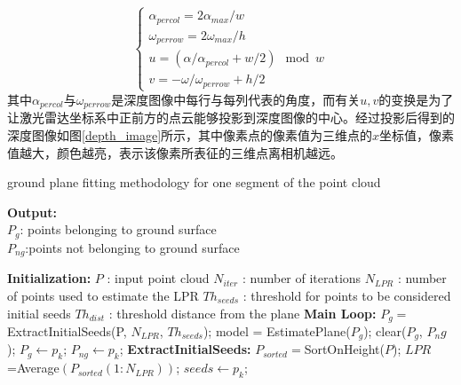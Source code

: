 \begin{equation}
    \begin{cases}
        \alpha_{percol} = 2\alpha_{max} / w \\
        \omega_{perrow} = 2\omega_{max} / h \\
        u = (\alpha / \alpha_{percol} + w / 2) \mod w \\
        v = - \omega / \omega_{perrow} + h / 2
    \end{cases}
\end{equation}
其中$\alpha_{percol}$与$\omega_{perrow}$是深度图像中每行与每列代表的角度，而有关$u,v$的变换是为了让激光雷达坐标系中正前方的点云能够投影到深度图像的中心。经过投影后得到的深度图像如图\ref{depth_image}所示，其中像素点的像素值为三维点的$x$坐标值，像素值越大，颜色越亮，表示该像素所表征的三维点离相机越远。
\begin{algorithm}[htbp]
    \caption{ground plane fitting methodology for one segment of the point cloud} %
    \label{ground plane fitting}
    \hspace*{0.02in} {\bf Output:} %
\\ $P_g$: points belonging to ground surface \\
$P_{ng}$:points not belonging to ground surface 

    \begin{algorithmic}[1]
    \State\hspace*{0.02in} {\bf Initialization:} %
    \State $P$ : input point cloud
    \State $N_{iter}$ : number of iterations
    \State $N_{LPR}$ : number of points used to estimate the LPR
    \State $Th_{seeds}$ : threshold for points to be considered initial seeds
    \State $Th_{dist}$ : threshold distance from the plane
    \State\hspace*{0.02in} {\bf Main Loop:} %
    \State $P_g=$  ExtractInitialSeeds(P, $N_{LPR}$, $Th_{seeds}$);
        \State model = EstimatePlane($P_g$);
        \State clear($P_g$, $P_ng$);
                \State $P_g \leftarrow p_k$;
            \Else
                \State $P_{ng} \leftarrow p_k$;
            \EndIf
        \EndFor
    \EndFor
    \State\hspace*{0.02in} {\bf ExtractInitialSeeds:}
    \State $P_{sorted}=$SortOnHeight($P$);
    \State $LPR$=Average$(P_{sorted}(1:N_{LPR}))$;
          \State $seeds\leftarrow p_k$;
        \EndIf
    \EndFor
    \end{algorithmic}
\end{algorithm}


